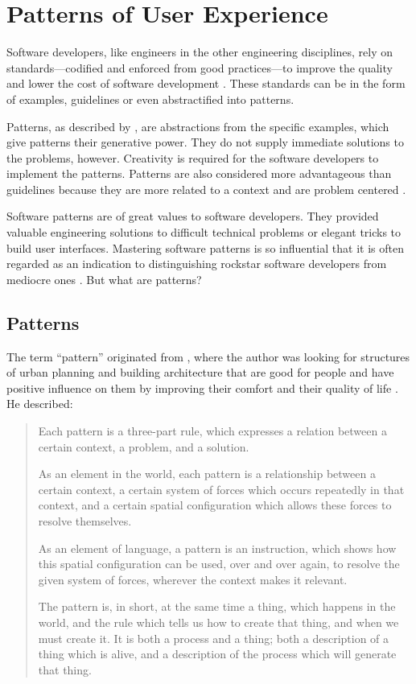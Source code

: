 \documentclass{acm_proc_article-sp}
\begin{document}
\citet{unix:raymond}


\section{Patterns of User Experience}
\label{sec:pux}
Software developers, like engineers in the other engineering
disciplines, rely on standards---codified and enforced from good
practices---to improve the quality and lower the cost of software
development \citep{practice:ipenz}. These standards can be in the form
of examples, guidelines or even abstractified into patterns.

Patterns, as described by \citet{patterns:griffiths}, are abstractions
from the specific examples, which give patterns their generative
power. They do not supply immediate solutions to the problems,
however. Creativity is required for the software developers to
implement the patterns. Patterns are also considered more advantageous
than guidelines because they are more related to a context and are
problem centered \citep{patterns:welie}.

Software patterns are of great values to software developers. They
provided valuable engineering solutions to difficult technical
problems or elegant tricks to build user interfaces. Mastering
software patterns is so influential that it is often regarded as an
indication to distinguishing rockstar software developers from
mediocre ones \citep{rockstar:iskold}. But what are patterns?

\subsection{Patterns}
The term ``pattern'' originated from \citet{timeless:alexander}, where
the author was looking for structures of urban planning and building
architecture that are good for people and have positive influence on
them by improving their comfort and their quality of life
\citep{patterns:appleton}. He described:
\begin{quote}
Each pattern is a three-part rule, which expresses a relation between
a certain context, a problem, and a solution.

As an element in the world, each pattern is a relationship between a
certain context, a certain system of forces which occurs repeatedly in
that context, and a certain spatial configuration which allows these
forces to resolve themselves.

As an element of language, a pattern is an instruction, which shows
how this spatial configuration can be used, over and over again, to
resolve the given system of forces, wherever the context makes it
relevant.

The pattern is, in short, at the same time a thing, which happens in
the world, and the rule which tells us how to create that thing, and
when we must create it. It is both a process and a thing; both a
description of a thing which is alive, and a description of the
process which will generate that thing.
\end{quote}
\end{document}
